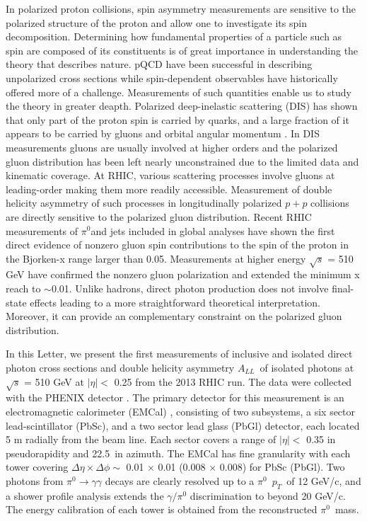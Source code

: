 \documentclass[twocolumn,letterpaper,aps,prl,longbibliography,superscriptaddress,floatfix]{revtex4-2}
\newcommand{\pT}{\ensuremath{p_T}}
\newcommand{\pizero}{\ensuremath{\pi^0}}
\newcommand{\ALL}{\ensuremath{A_{LL}}}
\begin{document}
In polarized proton collisions, spin asymmetry measurements are sensitive to the polarized structure of the proton and allow one to investigate its spin decomposition. Determining how fundamental properties of a particle such as spin are composed of its constituents is of great importance in understanding the theory that describes nature. pQCD have been successful in describing unpolarized cross sections while spin-dependent observables have historically offered more of a challenge. Measurements of such quantities enable us to study the theory in greater deapth. Polarized deep-inelastic scattering (DIS) has shown that only part of the proton spin is carried by quarks, and a large fraction of it appears to be carried by gluons and orbital angular momentum \cite{1988364, ALEXAKHIN20078}. In DIS measurements gluons are usually involved at higher orders and the polarized gluon distribution has been left nearly unconstrained due to the limited data and kinematic coverage. At RHIC, various scattering processes involve gluons at leading-order making them more readily accessible. Measurement of double helicity asymmetry of such processes in longitudinally polarized $p+p$ collisions are directly sensitive to the polarized gluon distribution. Recent RHIC measurements of \pizero and jets \cite{PhysRevD.90.012007, PhysRevLett.103.012003, PhysRevD.79.012003, PhysRevD.86.032006, PhysRevLett.115.092002} included in global analyses have shown the first direct evidence of nonzero gluon spin contributions to the spin of the proton \cite{PhysRevLett.113.012001} in the Bjorken-x range larger than 0.05. Measurements at higher energy $\sqrt{s}$ = 510 GeV \cite{PhysRevD.93.011501, PhysRevD.100.052005} have confirmed the nonzero gluon polarization and extended the minimum x reach to $\sim$0.01. Unlike hadrons, direct photon production does not involve final-state effects leading to a more straightforward theoretical interpretation. Moreover, it can provide an complementary constraint on the polarized gluon distribution.

In this Letter, we present the first measurements of inclusive and isolated direct photon cross sections and double helicity asymmetry \ALL\ of isolated photons at $\sqrt{s}$ = 510 GeV at $|\eta| <$ 0.25 from the 2013 RHIC run. The data were collected with the PHENIX detector \cite{ADCOX2003469}. The primary detector for this measurement is an electromagnetic calorimeter (EMCal) \cite{APHECETCHE2003521}, consisting of two subsystems, a six sector lead-scintillator (PbSc), and a two sector lead glass (PbGl) detector, each located 5 m radially from the beam line. Each sector covers a range of  $|\eta| <$ 0.35 in pseudorapidity and 22.5\textdegree\ in azimuth. The EMCal has fine granularity with each tower covering $\Delta\eta \times \Delta\phi \sim$ 0.01 $\times$ 0.01 (0.008 $\times$ 0.008) for PbSc (PbGl). Two photons from $\pi^0 \rightarrow \gamma\gamma$ decays are clearly resolved up to a \pizero\ \pT\ of 12 GeV/c, and a shower profile analysis extends the $\gamma/\pi^0$ discrimination to beyond 20 GeV/c. The energy calibration of each tower is obtained from the reconstructed \pizero\ mass.
\end{document}
